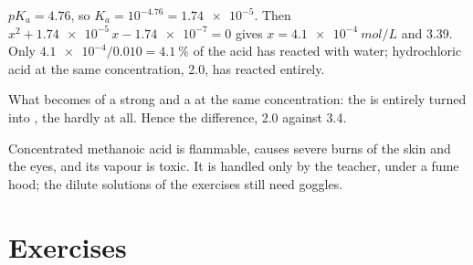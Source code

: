 \begin{example}\label{ex:g12:ka-and-pka:acetic}
$pK_a = 4.76$, so $K_a = 10^{-4.76} = \num{1.74e-5}$. Then
$x^2 + \num{1.74e-5}\,x - \num{1.74e-7} = 0$ gives
$x = \qty{4.1e-4}{mol/L}$ and  3.39. Only $\num{4.1e-4}/0.010 =
\qty{4.1}{\percent}$ of the acid has reacted with water; hydrochloric
acid at the same concentration,  2.0, has reacted entirely.
\end{example}

\begin{omfigure}

{\small What becomes of a strong and a  at the same
concentration: the  is entirely turned into , the  hardly at all. Hence the  difference, 2.0 against 3.4.}
\end{omfigure}

\begin{safety}{}
Concentrated methanoic acid is flammable, causes severe burns of the skin
and the eyes, and its vapour is toxic. It is handled only by the teacher,
under a fume hood; the dilute solutions of the exercises still need
goggles.
\end{safety}

\section{Exercises}

